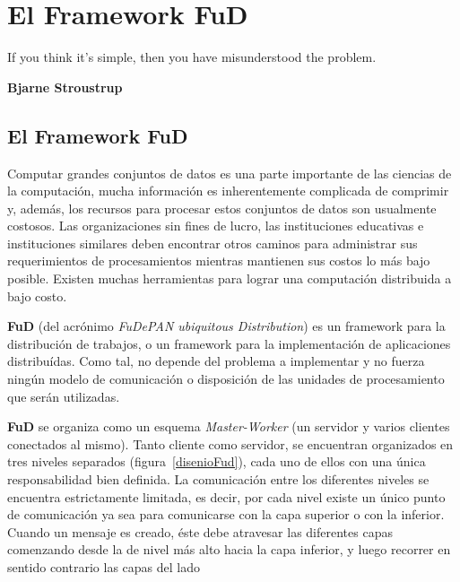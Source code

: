 \chapter{El Framework FuD}
\label{fudcplusplus}

\epigraph{If you think it’s simple, then you
have misunderstood the problem.
}%
{\textbf{Bjarne Stroustrup}}

\section{El Framework FuD}
\par Computar grandes conjuntos de datos es una parte importante de las ciencias de la computación, mucha información es inherentemente complicada de comprimir y, además, los recursos para procesar estos conjuntos de datos son usualmente costosos. Las organizaciones sin fines de lucro, las instituciones educativas e instituciones similares deben encontrar otros caminos para administrar sus requerimientos de procesamientos mientras mantienen sus costos lo más bajo posible. Existen muchas herramientas para lograr una computación distribuida a bajo costo.

\par \textbf{FuD} (del acrónimo \emph{FuDePAN ubiquitous Distribution}) es un framework para la distribución de trabajos, o un framework para la implementación de aplicaciones distribuídas\cite{clus09}. Como tal, no depende del problema a implementar y no fuerza ningún modelo de comunicación o disposición de las unidades de procesamiento que serán utilizadas. 

\par \textbf{FuD} se organiza como un esquema \emph{Master-Worker} (un servidor y varios clientes conectados al mismo). Tanto cliente como servidor, se encuentran organizados en tres niveles separados (figura~\ref{disenioFud}), cada uno de ellos con una única responsabilidad bien definida. La comunicación entre los diferentes niveles se encuentra estrictamente
limitada, es decir, por cada nivel existe un único punto de comunicación ya sea para comunicarse con la capa
superior o con la inferior. Cuando un mensaje es creado, éste debe atravesar las diferentes capas comenzando
desde la de nivel más alto hacia la capa inferior, y luego recorrer en sentido contrario las capas del lado

